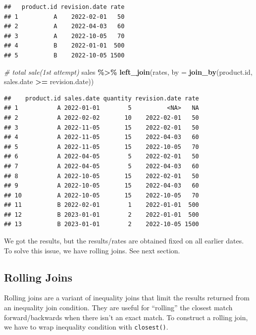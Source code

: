 \documentclass[
]{book}
\newenvironment{Shaded}{\begin{snugshade}}{\end{snugshade}}
\newcommand{\AttributeTok}[1]{\textcolor[rgb]{0.13,0.29,0.53}{#1}}
\newcommand{\CommentTok}[1]{\textcolor[rgb]{0.56,0.35,0.01}{\textit{#1}}}
\newcommand{\FunctionTok}[1]{\textcolor[rgb]{0.13,0.29,0.53}{\textbf{#1}}}
\newcommand{\NormalTok}[1]{#1}
\newcommand{\SpecialCharTok}[1]{\textcolor[rgb]{0.81,0.36,0.00}{\textbf{#1}}}
\begin{document}
\begin{verbatim}
##   product.id revision.date rate
## 1          A    2022-02-01   50
## 2          A    2022-04-03   60
## 3          A    2022-10-05   70
## 4          B    2022-01-01  500
## 5          B    2022-10-05 1500
\end{verbatim}

\begin{Shaded}
\begin{Highlighting}[]
\CommentTok{\# total sale(1st attempt)}
\NormalTok{sales }\SpecialCharTok{\%\textgreater{}\%} 
  \FunctionTok{left\_join}\NormalTok{(rates,}
            \AttributeTok{by =} \FunctionTok{join\_by}\NormalTok{(product.id,}
\NormalTok{                         sales.date }\SpecialCharTok{\textgreater{}=}\NormalTok{ revision.date))}
\end{Highlighting}
\end{Shaded}

\begin{verbatim}
##    product.id sales.date quantity revision.date rate
## 1           A 2022-01-01        5          <NA>   NA
## 2           A 2022-02-02       10    2022-02-01   50
## 3           A 2022-11-05       15    2022-02-01   50
## 4           A 2022-11-05       15    2022-04-03   60
## 5           A 2022-11-05       15    2022-10-05   70
## 6           A 2022-04-05        5    2022-02-01   50
## 7           A 2022-04-05        5    2022-04-03   60
## 8           A 2022-10-05       15    2022-02-01   50
## 9           A 2022-10-05       15    2022-04-03   60
## 10          A 2022-10-05       15    2022-10-05   70
## 11          B 2022-02-01        1    2022-01-01  500
## 12          B 2023-01-01        2    2022-01-01  500
## 13          B 2023-01-01        2    2022-10-05 1500
\end{verbatim}

We got the results, but the results/rates are obtained fixed on all earlier dates. To solve this issue, we have rolling joins. See next section.

\hypertarget{rolling-joins}{%
\subsection{Rolling Joins}\label{rolling-joins}}

Rolling joins are a variant of inequality joins that limit the results returned from an inequality join condition. They are useful for ``rolling'' the closest match forward/backwards when there isn't an exact match. To construct a rolling join, we have to wrap inequality condition with \texttt{closest()}.
\end{document}
